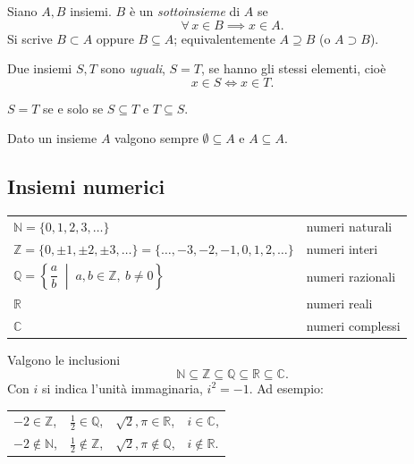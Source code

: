 \documentclass[11pt,a4paper]{article}
\begin{document}
\begin{definizione}
Siano $A, B$ insiemi. $B$ è un \emph{sottoinsieme} di $A$ se
\[
\forall\, x \in B \implies x \in A.
\]
Si scrive $B \subset A$ oppure $B \subseteq A$; equivalentemente
$A \supseteq B$ (o $A \supset B$).
\end{definizione}

\begin{definizione}
Due insiemi $S, T$ sono \emph{uguali}, $S = T$, se hanno gli stessi
elementi, cioè
\[
x \in S \iff x \in T.
\]
\end{definizione}

\begin{osservazione}
$S = T$ se e solo se $S \subseteq T$ e $T \subseteq S$.
\end{osservazione}

Dato un insieme $A$ valgono sempre $\emptyset \subseteq A$ e
$A \subseteq A$.

\subsection*{Insiemi numerici}

\begin{center}
\begin{tabular}{ll}
$\mathbb{N} = \{0, 1, 2, 3, \dots\}$ & numeri naturali \\
$\mathbb{Z} = \{0, \pm 1, \pm 2, \pm 3, \dots\}
              = \{\dots, -3, -2, -1, 0, 1, 2, \dots\}$ & numeri interi \\
$\mathbb{Q} = \left\{ \dfrac{a}{b} \;\middle|\; a, b \in \mathbb{Z},\
              b \neq 0 \right\}$ & numeri razionali \\
$\mathbb{R}$ & numeri reali \\
$\mathbb{C}$ & numeri complessi
\end{tabular}
\end{center}

Valgono le inclusioni
\[
\mathbb{N} \subseteq \mathbb{Z} \subseteq \mathbb{Q} \subseteq
\mathbb{R} \subseteq \mathbb{C}.
\]
Con $i$ si indica l'unità immaginaria, $i^2 = -1$. Ad esempio:
\begin{center}
\begin{tabular}{llll}
$-2 \in \mathbb{Z}$, & $\frac12 \in \mathbb{Q}$, &
$\sqrt{2}, \pi \in \mathbb{R}$, & $i \in \mathbb{C}$, \\
$-2 \notin \mathbb{N}$, & $\frac12 \notin \mathbb{Z}$, &
$\sqrt{2}, \pi \notin \mathbb{Q}$, & $i \notin \mathbb{R}$.
\end{tabular}
\end{center}
\end{document}

